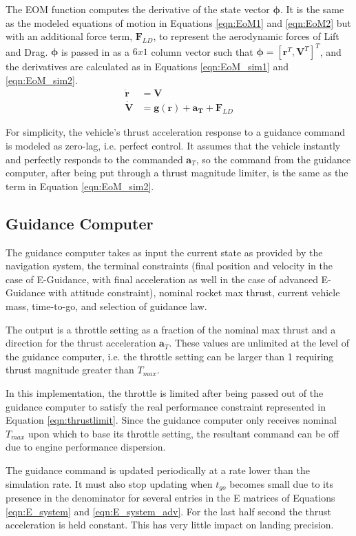 The EOM function computes the derivative of the state vector $\bm{\phi}$. It is the same as the modeled equations of motion in Equations \ref{eqn:EoM1} and \ref{eqn:EoM2} but with an additional force term, $\bm{F}_{LD}$, to represent the aerodynamic forces of Lift and Drag. $\bm{\phi}$ is passed in as a $6x1$ column vector such that $\bm{\phi} = [\bm{r}^T,\bm{V}^T]^T$, and the derivatives are calculated as in Equations \ref{eqn:EoM_sim1} and \ref{eqn:EoM_sim2}.
\begin{align}
\label{eqn:EoM_sim1}
\boldsymbol{\dot{r}} &= \boldsymbol{V}\\
\label{eqn:EoM_sim2}
\boldsymbol{\dot{V}} &= \boldsymbol{g(r)} + \boldsymbol{a_T} + \bm{F}_{LD}
\end{align}

For simplicity, the vehicle's thrust acceleration response to a guidance command is modeled as zero-lag, i.e. perfect control. It assumes that the vehicle instantly and perfectly responds to the commanded $\bm{a}_T$, so the command from the guidance computer, after being put through a thrust magnitude limiter, is the same as the term in Equation \ref{eqn:EoM_sim2}.

\subsection{Guidance Computer} \label{sec:guidancecomp}
The guidance computer takes as input the current state as provided by the navigation system, the terminal constraints (final position and velocity in the case of E-Guidance, with final acceleration as well in the case of advanced E-Guidance with attitude constraint), nominal rocket max thrust, current vehicle mass, time-to-go, and selection of guidance law.

The output is a throttle setting as a fraction of the nominal max thrust and a direction for the thrust acceleration $\bm{a}_T$. These values are unlimited at the level of the guidance computer, i.e. the throttle setting can be larger than 1 requiring thrust magnitude greater than $T_{max}$. 

In this implementation, the throttle is limited after being passed out of the guidance computer to satisfy the real performance constraint represented in Equation \ref{eqn:thrustlimit}. Since the guidance computer only receives nominal $T_{max}$ upon which to base its throttle setting, the resultant command can be off due to engine performance dispersion.

The guidance command is updated periodically at a rate lower than the simulation rate. It must also stop updating when $t_{go}$ becomes small due to its presence in the denominator for several entries in the E matrices of Equations \ref{eqn:E_system} and \ref{eqn:E_system_adv}. For the last half second the thrust acceleration is held constant. This has very little impact on landing precision.

